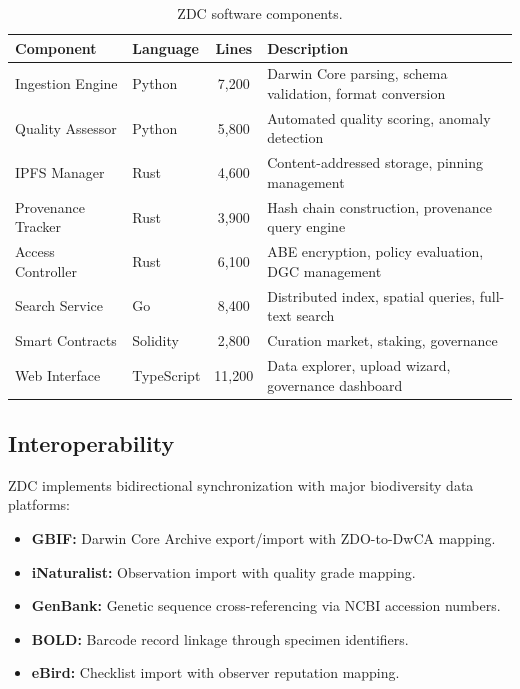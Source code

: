\documentclass[11pt,a4paper]{article}
\begin{document}
\begin{table}[H]
\centering
\caption{ZDC software components.}
\label{tab:software}
\begin{tabularx}{\textwidth}{@{}llcX@{}}
\toprule
\textbf{Component} & \textbf{Language} & \textbf{Lines} & \textbf{Description} \\
\midrule
Ingestion Engine & Python & 7,200 & Darwin Core parsing, schema validation, format conversion \\
Quality Assessor & Python & 5,800 & Automated quality scoring, anomaly detection \\
IPFS Manager & Rust & 4,600 & Content-addressed storage, pinning management \\
Provenance Tracker & Rust & 3,900 & Hash chain construction, provenance query engine \\
Access Controller & Rust & 6,100 & ABE encryption, policy evaluation, DGC management \\
Search Service & Go & 8,400 & Distributed index, spatial queries, full-text search \\
Smart Contracts & Solidity & 2,800 & Curation market, staking, governance \\
Web Interface & TypeScript & 11,200 & Data explorer, upload wizard, governance dashboard \\
\bottomrule
\end{tabularx}
\end{table}

\subsection{Interoperability}

ZDC implements bidirectional synchronization with major biodiversity data platforms:

\begin{itemize}[leftmargin=*]
    \item \textbf{GBIF:} Darwin Core Archive export/import with ZDO-to-DwCA mapping.
    \item \textbf{iNaturalist:} Observation import with quality grade mapping.
    \item \textbf{GenBank:} Genetic sequence cross-referencing via NCBI accession numbers.
    \item \textbf{BOLD:} Barcode record linkage through specimen identifiers.
    \item \textbf{eBird:} Checklist import with observer reputation mapping.
\end{itemize}
\end{document}
